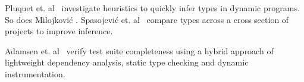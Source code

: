 Pluquet et. al~\cite{marot2009fast} investigate heuristics
to quickly infer types in dynamic programs.
So does Milojkovi{\'c}
\cite{milojkovic2016exploring}.
Spasojevi{\'c} et. al~\cite{spasojevic2014mining}
compare types across a cross section of projects to improve
inference.

Adamsen et. al~\cite{adamsen2016analyzing} verify test suite completeness using a hybrid approach of lightweight dependency analysis, static type checking and dynamic instrumentation.



